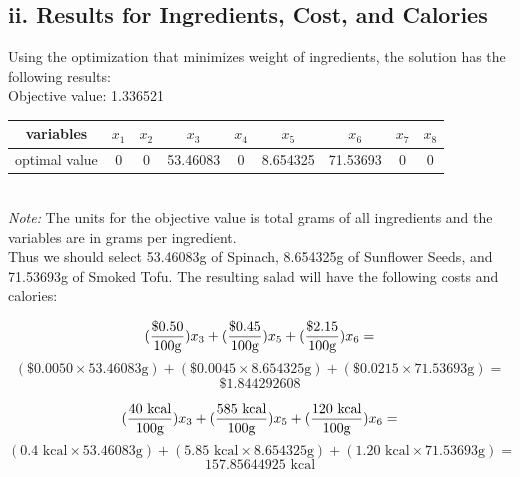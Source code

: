 \documentclass[11pt]{scrreprt}
\begin{document}
\subsection{ii. Results for Ingredients, Cost, and Calories}
Using the optimization that minimizes weight of ingredients, the solution has the following results:\\

Objective value: 1.336521\\

\begin{tabular}{|c|c|c|c|c|c|c|c|c|}
	\hline variables & $x_{1}$ & $x_{2}$ & $x_{3}$ & $x_{4}$ & $x_{5}$ & $x_{6}$ & $x_{7}$ & $x_{8}$ \\
	\hline optimal value & 0 & 0 & 53.46083 & 0 & 8.654325 & 71.53693 & 0 & 0 \\
	\hline
\end{tabular} \\

{\it Note:} The units for the objective value is total grams of all ingredients and the variables are in grams per ingredient.\\

Thus we should select 53.46083g of Spinach, 8.654325g of Sunflower Seeds, and 71.53693g of Smoked Tofu. The resulting salad will have the following costs and calories:

\begin{displaymath}
({\$0.50 \over 100\text{g}})x_3 + ({\$0.45 \over 100\text{g}})x_5 + ({\$2.15 \over 100\text{g}})x_6 =
\end{displaymath}
\begin{displaymath}
(\$0.0050 \times 53.46083\text{g}) + (\$0.0045 \times 8.654325\text{g}) + (\$0.0215 \times 71.53693\text{g}) =
\end{displaymath}
\begin{displaymath}
\$1.844292608
\end{displaymath}

\begin{displaymath}
({40\text{ kcal} \over 100\text{g}})x_3 + ({585\text{ kcal} \over 100\text{g}})x_5 + ({120\text{ kcal} \over 100\text{g}})x_6 =
\end{displaymath}
\begin{displaymath}
(0.4\text{ kcal} \times 53.46083\text{g}) + (5.85\text{ kcal} \times 8.654325\text{g}) + (1.20\text{ kcal} \times 71.53693\text{g}) =
\end{displaymath}
\begin{displaymath}
157.85644925\text{ kcal}
\end{displaymath}
\end{document}
